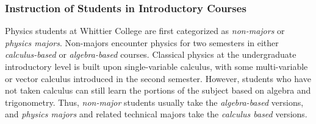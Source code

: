 \documentclass[../../main.tex]{subfiles}
\begin{document}
\subsubsection{Instruction of Students in Introductory Courses}

\label{sec:teaching_phil1}

Physics students at Whittier College are first categorized as \textit{non-majors} or \textit{physics majors}.  Non-majors encounter physics for two semesters in either \textit{calculus-based} or \textit{algebra-based} courses.  Classical physics at the undergraduate introductory level is built upon single-variable calculus, with some multi-variable or vector calculus introduced in the second semester.  However, students who have not taken calculus can still learn the portions of the subject based on algebra and trigonometry.  Thus, \textit{non-major} students usually take the \textit{algebra-based} versions, and \textit{physics majors} and related technical majors take the \textit{calculus based} versions.  \\ \hspace{0.1cm}
\end{document}
